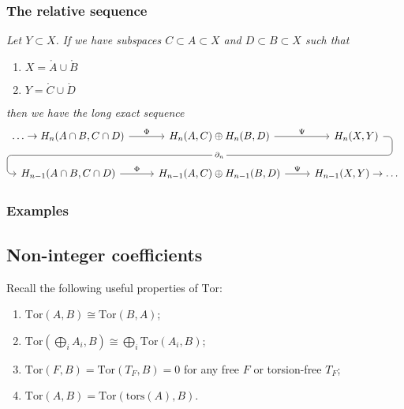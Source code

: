 \documentclass[10pt]{article}
\newcommand{\Tor}{\mathrm{Tor}}
\newcommand{\interior}[1]{\mathring{#1}}
\begin{document}
            \subsubsection{The relative sequence}

                \emph{Let $Y\subset X$.}
                \emph{If we have subspaces $C\subset A\subset X$ and $D\subset B\subset X$ such that}
                    \begin{enumerate}
                        \item $X=\interior{A}\cup\interior{B}$
                        \item $Y=\interior{C}\cup\interior{D}$
                    \end{enumerate}
                \emph{then we have the long exact sequence}
                \begin{equation*}
                    \begin{tikzcd}
                        \ldots\to{H}_n(A\cap B,C\cap D) \rar{\Phi}
                        & {H}_n(A,C)\oplus{H}_n(B,D) \rar{\Psi} \ar[draw=none]{d}[name=X, anchor=center]{}
                        & {H}_n(X,Y) \ar[rounded corners,
                                to path={ -- ([xshift=2ex]\tikztostart.east)
                                          |- (X.center) \tikztonodes
                                          -| ([xshift=-2ex]\tikztotarget.west)
                                          -- (\tikztotarget)}]{dll}[description, at end]{\partial_n} \\
                        {H}_{n-1}(A\cap B,C\cap D) \rar{\Phi}
                        & {H}_{n-1}(A,C)\oplus{H}_{n-1}(B,D) \rar{\Psi}
                        & {H}_{n-1}(X,Y)\to\ldots
                    \end{tikzcd}
                \end{equation*}

            \subsubsection{Examples}


        \subsection{Non-integer coefficients}

            Recall the following useful properties of $\Tor$:
            \begin{enumerate}
                \item $\Tor(A,B)\cong\Tor(B,A)$;
                \item $\Tor(\bigoplus_i A_i,B)\cong\bigoplus_i\Tor(A_i,B)$;
                \item $\Tor(F,B)=\Tor(T_F,B)=0$ for any free $F$ or torsion-free $T_F$;
                \item $\Tor(A,B)=\Tor(\mathrm{tors}(A),B)$.
            \end{enumerate}
\end{document}
